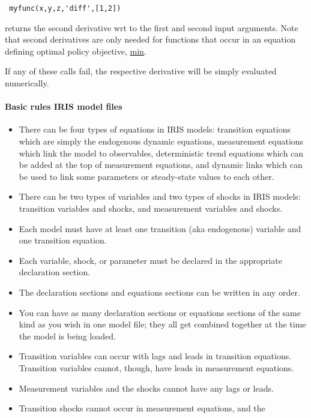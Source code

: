  \begin{verbatim}
 myfunc(x,y,z,'diff',[1,2])
 \end{verbatim}
 
 returns the second derivative wrt to the first and second input
 arguments. Note that second derivatives are only needed for functions
 that occur in an equation defining optimal policy objective,
 \href{modellang/min}{min}.
 
 If any of these calls fail, the respective derivative will be simply
 evaluated numerically.
 
 \paragraph{Basic rules IRIS model files}
 
 \begin{itemize}
 \item
   There can be four types of equations in IRIS models: transition
   equations which are simply the endogenous dynamic equations,
   measurement equations which link the model to observables,
   deterministic trend equations which can be added at the top of
   measurement equations, and dynamic links which can be used to link
   some parameters or steady-state values to each other.
 \item
   There can be two types of variables and two types of shocks in IRIS
   models: transition variables and shocks, and measurement variables and
   shocks.
 \item
   Each model must have at least one transition (aka endogenous) variable
   and one transition equation.
 \item
   Each variable, shock, or parameter must be declared in the appropriate
   declaration section.
 \item
   The declaration sections and equations sections can be written in any
   order.
 \item
   You can have as many declaration sections or equations sections of the
   same kind as you wish in one model file; they all get combined
   together at the time the model is being loaded.
 \item
   Transition variables can occur with lags and leads in transition
   equations. Transition variables cannot, though, have leads in
   measurement equations.
 \item
   Measurement variables and the shocks cannot have any lags or leads.
 \item
   Transition shocks cannot occur in measurement equations, and the

\end{itemize}
